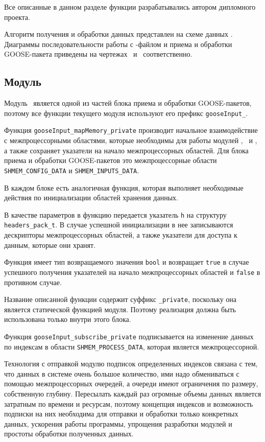 Все описанные в данном разделе функции разрабатывались автором дипломного проекта.


Алгоритм получения и обработки данных представлен на схеме
данных \dataScheme. Диаграммы последовательности работы с \cid-файлом и
приема и обработки GOOSE-пакета приведены
на чертежах \seqIcdScheme\ и \seqGooseScheme\ соответственно.

\subsection{Модуль \moduleSettingsApply}

Модуль \moduleSettingsApply\ является одной из частей блока приема и обработки
GOOSE-пакетов, поэтому все функции текущего модуля используют его префикс
\lstinline{gooseInput_}.

Функция \lstinline{gooseInput_mapMemory_private} производит начальное взаимодействие
с межпроцессорными областями, которые необходимы для работы модулей
\moduleRecvPackets, \moduleThreads\ и \moduleProcessPackets, а также
сохраняет указатели на начало
межпроцессорных областей.
Для блока приема и обработки GOOSE-пакетов это
межпроцессорные области \lstinline{SHMEM_CONFIG_DATA} и \lstinline{SHMEM_INPUTS_DATA}.

В каждом блоке есть аналогичная функция, которая выполняет необходимые действия
по инициализации областей хранения данных.

В качестве параметров в функцию передается указатель \lstinline{h} на структуру
\lstinline{headers_pack_t}. В случае успешной инициализации в нее записываются
дескрипторы межпроцессорных областей, а также указатели
для доступа к данным, которые они хранят.

Функция имеет тип возвращаемого значения \lstinline{bool} и возвращает
\lstinline{true} в случае успешного получения указателей на начало межпроцессорных
областей и \lstinline{false} в противном случае.

Название описанной функции содержит суффикс \lstinline{_private},
поскольку она является статической функцией модуля. Поэтому реализация
должна быть использована только внутри этого блока.

Функция \lstinline{gooseInput_subscribe_private} подписывается на
изменение данных по индексам в области \lstinline{SHMEM_PROCESS_DATA},
которая является межпроцессорной.

Технология с отправкой модулю подписок определенных индексов связана с тем,
что данных в системе очень большое количество, ими надо обмениваться с помощью межпроцессорных очередей, а очереди имеют ограничения по размеру, собственную глубину.
Пересылать каждый раз огромные объемы данных является затратным по времени и
ресурсам, поэтому концепция индексов и возможность подписки на них необходима
для отправки и обработки только конкретных данных,
ускорения работы программы, упрощения разработки модулей и простоты обработки полученных данных.

